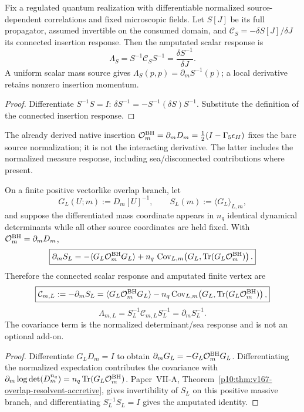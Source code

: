 \documentclass[12pt,a4paper]{article}
\begin{document}
\begin{proposition}
\label{p12:prop:v2109-scalar-vertex-source-derivative}
Fix a regulated quantum realization with differentiable normalized
source-dependent correlations and fixed microscopic fields.  Let \(S[J]\)
be its full propagator, assumed invertible on the consumed domain, and
\(\mathcal C_S=-\delta S[J]/\delta J\) its connected insertion response.
Then the amputated scalar response is
\[
 \Lambda_S=S^{-1}\mathcal C_SS^{-1}
           =\frac{\delta S^{-1}}{\delta J}.
\]
A uniform scalar mass source gives
\(\Lambda_S(p,p)=\partial_m S^{-1}(p)\); a local derivative retains
nonzero insertion momentum.
\end{proposition}
\begin{proof}
Differentiate \(S^{-1}S=I\):
\(\delta S^{-1}=-S^{-1}(\delta S)S^{-1}\).
Substitute the definition of the connected insertion response.
\end{proof}
The already derived native insertion
\(\mathcal O_m^{\rm BH}=\partial_mD_m
=\tfrac12(I-\Gamma_5\epsilon_H)\) fixes the bare source normalization;
it is not the interacting derivative.  The latter includes the normalized
measure response, including sea/disconnected contributions where present.

\begin{theorem}
\label{p12:thm:v2123-complete-finite-bh-scalar-response}
On a finite positive vectorlike overlap branch, let
\[
 G_L(U;m):=D_m[U]^{-1},\qquad S_L(m):=\langle G_L\rangle_{L,m},
\]
and suppose the differentiated mass coordinate appears in $n_q$ identical
dynamical determinants while all other source coordinates are held fixed.
With $\mathcal O_m^{\rm BH}=\partial_mD_m$,
\[
 \boxed{
 \partial_mS_L
 =-\langle G_L\mathcal O_m^{\rm BH}G_L\rangle
 +n_q\,\operatorname{Cov}_{L,m}\!\left(
 G_L,\operatorname{Tr}(G_L\mathcal O_m^{\rm BH})\right).}
\]
Therefore the connected scalar response and amputated finite vertex are
\[
 \boxed{
 \mathcal C_{m,L}:=-\partial_mS_L
 =\langle G_L\mathcal O_m^{\rm BH}G_L\rangle
 -n_q\operatorname{Cov}_{L,m}\!\left(
 G_L,\operatorname{Tr}(G_L\mathcal O_m^{\rm BH})\right),}
\]
\[
 \boxed{
 \Lambda_{m,L}
 =S_L^{-1}\mathcal C_{m,L}S_L^{-1}
 =\partial_mS_L^{-1}.}
\]
The covariance term is the normalized determinant/sea response and is not an
optional add-on.
\end{theorem}
\begin{proof}
Differentiate $G_LD_m=I$ to obtain
$\partial_mG_L=-G_L\mathcal O_m^{\rm BH}G_L$.  Differentiating the normalized
expectation contributes the covariance with
$\partial_m\log\det(D_m^{n_q})=n_q\operatorname{Tr}(G_L\mathcal O_m^{\rm BH})$.
Paper~VII-A, Theorem~\ref{p10:thm:v167-overlap-resolvent-accretive}, gives
invertibility of $S_L$ on this positive massive branch, and differentiating
$S_L^{-1}S_L=I$ gives the amputated identity.
\end{proof}
\end{document}
